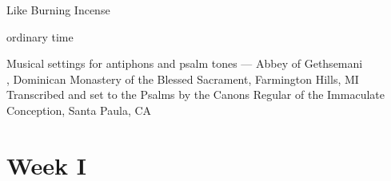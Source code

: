 \documentclass[12pt]{book}
\begin{document}
\pagestyle{empty}
\onecolumn

\null\vfill
\begin{center}
  \huge
  
  Like Burning Incense

  \bigskip\LARGE ordinary time

  \vfill\vfill\null

\end{center}


\newpage

\null\vfill
\begin{center}
  \vfill\small
  Musical settings for antiphons and psalm tones --- Abbey of Gethsemani\\
  , Dominican Monastery of the Blessed Sacrament, Farmington Hills, MI\\
  Transcribed and set to the Psalms by the Canons Regular of the Immaculate Conception, Santa Paula, CA
\end{center}

\newpage



\tableofcontents
\setlength{\columnseprule}{0pt}
\null

\twocolumn

\chapter{Week I}
\setlength{\columnseprule}{0.4pt}
\pagestyle{fancy}





\end{document}
